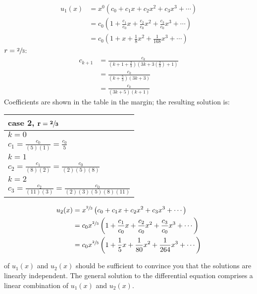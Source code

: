 \begin{align*}
u_1(x) &= x^0\left(c_0 + c_1x + c_2x^2 + c_3x^3 + \cdots \right) \\
&= c_0\left(1 + \frac{c_1}{c_0}x + \frac{c_2}{c_0}x^2 + \frac{c_3}{c_0}x^3 + \cdots \right) \\
&= c_0\left(1+x+\frac{1}{8}x^2+\frac{1}{168}x^3+\cdots \right)
\end{align*}
\vspace{0.25cm}
\noindent\underline{$r=\sfrac{2}{3}$}:
\begin{align*}
c_{k+1} &=\frac{c_k}{(k+1+\frac{2}{3})(3k+3\left(\frac{2}{3}\right)+1)}\\
&=\frac{c_k}{\left(k+\frac{5}{3}\right)(3k+3)} \\
&=\frac{c_k}{(3k+5)(k+1)}
\end{align*}
\noindent Coefficients are shown in the table in the margin; the resulting solution is:
\begin{margintable}
\begin{tabular}{|l|}
\hline
\textbf{case 2, } $\mathbf{r=\sfrac{2}{3}}$ \\\hline
$k=0$ \\
$c_1 = \frac{c_0}{(5)(1)} = \frac{c_0}{5}$ \\\hline
$k=1$ \\
$c_2 = \frac{c_1}{(8)(2)} = \frac{c_0}{(2)(5)(8)}$ \\\hline
$k=2$ \\
$c_3 = \frac{c_2}{(11)(3)} = \frac{c_0}{(2)(3)(5)(8)(11)}$\\\hline
\end{tabular}
\end{margintable}
\begin{align*}
u_2(x) &= x^{\sfrac{2}{3}}\left(c_0 + c_1x + c_2x^2 + c_3x^3 + \cdots \right) \\
&= c_0x^{\sfrac{2}{3}}\left(1 + \frac{c_1}{c_0}x+\frac{c_2}{c_0}x^2+\frac{c_3}{c_0}x^3 + \cdots \right) \\
&= c_0x^{\sfrac{2}{3}}\left(1+\frac{1}{5}x + \frac{1}{80}x^2+\frac{1}{264}x^3 + \cdots  \right)
\end{align*}

 of $u_1(x)$ and $u_2(x)$ should be sufficient to convince you that the solutions are linearly independent.  The general solution to the differential equation comprises a linear combination of $u_1(x)$ and $u_2(x)$.

\vspace{5.0cm}

